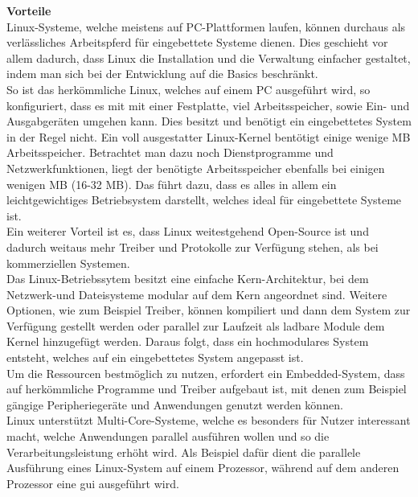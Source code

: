 \textbf{Vorteile}\\
Linux-Systeme, welche meistens auf PC-Plattformen laufen, können durchaus als verlässliches Arbeitspferd für eingebettete Systeme dienen.
Dies geschieht vor allem dadurch, dass Linux die Installation und die Verwaltung einfacher gestaltet, indem man sich bei der Entwicklung
auf die Basics beschränkt.\\
So ist das herkömmliche Linux, welches auf einem PC ausgeführt wird, so konfiguriert, dass es mit mit einer Festplatte, viel Arbeitsspeicher, sowie Ein- und Ausgabgeräten umgehen kann.
Dies besitzt und benötigt ein eingebettetes System in der Regel nicht. Ein voll ausgestatter Linux-Kernel bentötigt einige wenige MB Arbeitsspeicher. Betrachtet man dazu noch Dienstprogramme
und Netzwerkfunktionen, liegt der benötigte
 Arbeitsspeicher ebenfalls bei einigen wenigen MB (16-32 MB). Das führt dazu, dass es alles in allem ein leichtgewichtiges
 Betriebsystem darstellt, welches ideal für eingebettete Systeme ist.\\
 Ein weiterer Vorteil ist es, dass Linux weitestgehend Open-Source ist und dadurch weitaus mehr Treiber und Protokolle zur Verfügung stehen, als bei kommerziellen Systemen. \\
 Das Linux-Betriebssytem besitzt eine einfache Kern-Architektur, bei dem Netzwerk-und Dateisysteme modular auf dem Kern angeordnet sind. Weitere Optionen, wie zum Beispiel Treiber,
  können kompiliert und dann dem System zur Verfügung gestellt werden
 oder parallel zur Laufzeit als ladbare Module dem Kernel hinzugefügt werden. Daraus folgt, dass ein hochmodulares System entsteht, welches auf ein eingebettetes System angepasst ist.\\
 Um die Ressourcen bestmöglich zu nutzen, erfordert ein Embedded-System, dass auf herkömmliche Programme und Treiber aufgebaut ist, mit denen zum Beispiel gängige Peripheriegeräte und
 Anwendungen genutzt werden können.\\
 Linux unterstützt Multi-Core-Systeme, welche es besonders für Nutzer interessant macht, welche Anwendungen parallel ausführen wollen und so die Verarbeitungsleistung erhöht wird.
  Als Beispiel dafür dient die parallele Ausführung eines Linux-System auf einem Prozessor,
  während auf dem anderen Prozessor eine \ac{gui} ausgeführt wird.\cite{ibm}\\


